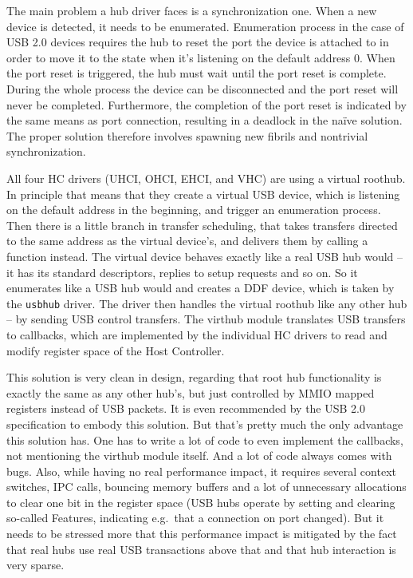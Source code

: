 The main problem a hub driver faces is a synchronization one. When a new device
is detected, it needs to be enumerated. Enumeration process in the case of USB 2.0
devices requires the hub to reset the port the device is attached to in order to move
it to the  state when it's listening on the default address 0.
When the port reset is triggered, the hub must wait until the port reset is
complete. During the whole process the device can be disconnected and the
port reset will never be completed. Furthermore, the completion of the port reset
is indicated by the same means as port connection, resulting in a deadlock in
the na\"ive solution. The proper solution therefore involves spawning new
fibrils and nontrivial synchronization.

All four HC drivers (UHCI, OHCI, EHCI, and VHC) are using a virtual roothub. In
principle that means that they create a virtual USB device, which is listening
on the default address in the beginning, and trigger an enumeration process.
Then there is a little branch in transfer scheduling, that takes transfers
directed to the same address as the virtual device's, and delivers them by
calling a function instead. The virtual device behaves exactly like a real USB
hub would -- it has its standard descriptors, replies to setup requests and so
on. So it enumerates like a USB hub would and creates a DDF device, which is
taken by the \texttt{usbhub} driver. The driver then handles the virtual
roothub like any other hub -- by sending USB control transfers. The virthub
module translates USB transfers to callbacks, which are implemented by the
individual HC drivers to read and modify register space of the Host Controller.

This solution is very clean in design, regarding that root hub functionality is
exactly the same as any other hub's, but just controlled by MMIO mapped
registers instead of USB packets. It is even recommended by the USB 2.0
specification \cite{usb2} to embody this solution. But that's pretty much the only advantage
this solution has. One has to write a lot of code to even implement the
callbacks, not mentioning the virthub module itself. And a lot of code always
comes with bugs. Also, while having no real performance impact, it requires
several context switches, IPC calls, bouncing memory buffers and a lot of
unnecessary allocations to clear one bit in the register space (USB hubs
operate by setting and clearing so-called Features, indicating e.g.\ that
a connection on port changed). But it needs to be stressed more that this
performance impact is mitigated by the fact that real hubs use real USB transactions
above that and that hub interaction is very sparse.

